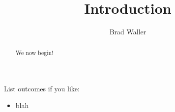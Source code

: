 \documentclass{ximera}
\title{Introduction}
\author{Brad Waller}
\begin{document}
\begin{abstract}
  We now begin!
\end{abstract}
\maketitle

List outcomes if you like:

\begin{itemize}
  \item blah
\end{itemize}
\end{document}
